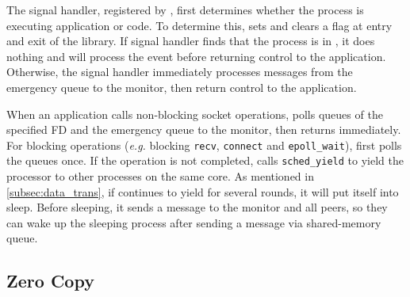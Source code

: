 The signal handler, registered by \libipc{}, first determines whether the process is executing application or \libipc{} code. To determine this, \libipc{} sets and clears a flag at entry and exit of the library. If signal handler finds that the process is in \libipc, it does nothing and \libipc{} will process the event before returning control to the application. Otherwise, the signal handler immediately processes messages from the emergency queue to the monitor, then return control to the application. 

When an application calls non-blocking socket operations, \libipc{} polls queues of the specified FD and the emergency queue to the monitor, then returns immediately. For blocking operations (\textit{e.g.} blocking \texttt{recv}, \texttt{connect} and \texttt{epoll\_wait}), \libipc{} first polls the queues once. If the operation is not completed, \libipc{} calls \texttt{sched\_yield} to yield the processor to other processes on the same core. %
As mentioned in \ref{subsec:data_trans}, if \libipc{} continues to yield for several rounds, it will put itself into sleep. Before sleeping, it sends a message to the monitor and all peers, so they can wake up the sleeping process after sending a message via shared-memory queue.



\subsection{Zero Copy}
\label{subsec:zerocopy}

